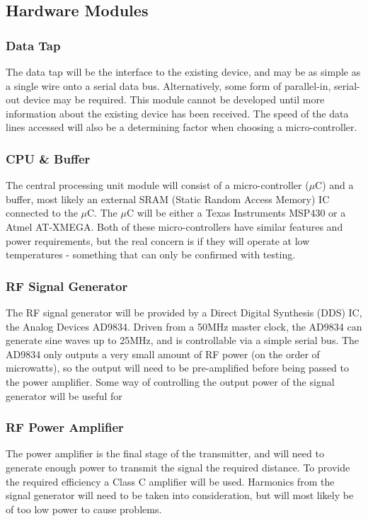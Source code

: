 \documentclass[a4paper,12pt]{article}
\begin{document}
\subsection{Hardware Modules}
\subsubsection{Data Tap}
The data tap will be the interface to the existing device, and may be as simple as a single wire onto a serial data bus. Alternatively, some form of parallel-in, serial-out device may be required. This module cannot be developed until more information about the existing device has been received. The speed of the data lines accessed will also be a determining factor when choosing a micro-controller. 

\subsubsection{CPU \& Buffer}
The central processing unit module will consist of a micro-controller ($\mu$C) and a buffer, most likely an external SRAM (Static Random Access Memory) IC connected to the $\mu$C. The $\mu$C will be either a Texas Instruments MSP430 or a Atmel AT-XMEGA. Both of these micro-controllers have similar features and power requirements, but the real concern is if they will operate at low temperatures - something that can only be confirmed with testing.

\subsubsection{RF Signal Generator}
The RF signal generator will be provided by a Direct Digital Synthesis (DDS) IC, the Analog Devices AD9834. Driven from a 50MHz master clock, the AD9834 can generate sine waves up to 25MHz, and is controllable via a simple serial bus. The AD9834 only outputs a very small amount of RF power (on the order of microwatts), so the output will need to be pre-amplified before being passed to the power amplifier. Some way of controlling the output power of the signal generator will be useful for 

\subsubsection{RF Power Amplifier}
The power amplifier is the final stage of the transmitter, and will need to generate enough power to transmit the signal the required distance. To provide the required efficiency a Class C amplifier will be used. Harmonics from the signal generator will need to be taken into consideration, but will most likely be of too low power to cause problems. 
\end{document}
